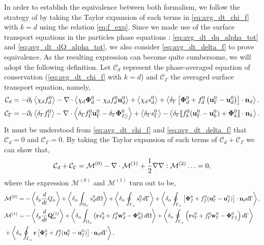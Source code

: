 In order to establish the equivalence between both formalism, we follow the strategy of \citep{lhuillier2000bilan,lhuillier2009rheology} by taking the Taylor expansion of each terms in \ref{eq:avg_dt_chi_f} with $k=d$ using the relation \ref{eq:f_exp}. 
Since we made use of the surface transport equations in the particles phase equations : \ref{eq:avg_dt_dq_alpha_tot} and \ref{eq:avg_dt_dQ_alpha_tot}, we also consider \ref{eq:avg_dt_delta_f} to prove equivalence. 
As the resulting expression can become quite cumbersome, we will adopt the following definition. 
Let $\mathcal{C}_d$ represent the phase-averaged equation of conservation (\ref{eq:avg_dt_chi_f} with $k=d$) and $\mathcal{C}_\Gamma $ the averaged surface transport equation, namely, 
\begin{align*}
    \mathcal{C}_d
    &=
    - \partial_t \left<\chi_df_d^0\right>
    - \mathbf{\nabla}\cdot \left<\chi_d \mathbf{\Phi}_d^0 - \chi_df_d^0 \textbf{u}_d^0\right>
    + \left<\chi_d s_d^0\right>
    + \left<\delta_\Gamma \left[
        \mathbf{\Phi}_d^0
        + f_d^0
        \left(
            \textbf{u}_\Gamma ^0
            - \textbf{u}_d^0
        \right)
    \right]
    \cdot \textbf{n}_d\right>.\\
    \mathcal{C}_\Gamma 
    &= 
    -\partial_t \left<\delta_\Gamma f_\Gamma ^0\right>
    -\mathbf{\nabla}\cdot \left<\delta_\Gamma  f_\Gamma ^0 \textbf{u}_\Gamma ^0-\delta_\Gamma  \mathbf{\Phi}_{I||}^0 \right>
    + \left<\delta_\Gamma s_\Gamma ^0\right> 
    - \left<\delta_\Gamma  \llbracket 
    f_k^0 (\textbf{u}_\Gamma ^0 - \textbf{u}_k^0)
    + \mathbf{\Phi}_k^0
     \rrbracket \cdot \textbf{n}_k \right>. 
\end{align*}
It must be understood from \ref{eq:avg_dt_chi_f} and \ref{eq:avg_dt_delta_f} that $\mathcal{C}_d=0$ and $\mathcal{C}_\Gamma =0$.
By taking the Taylor expansion of each terms of $\mathcal{C}_d+\mathcal{C}_\Gamma $ we can show that,
\begin{equation}
    \mathcal{C}_d 
    + \mathcal{C}_\Gamma  
    = \mathcal{M}^{(0)} - \mathbf{\nabla}\cdot \mathcal{M}^{(1)} + \frac{1}{2} \mathbf{\nabla}\mathbf{\nabla} : \mathcal{M}^{(2)} \ldots = 0,
    \label{eq:scheme_equivalence}
\end{equation} 
where the expression $\mathcal{M}^{(0)}$ and $\mathcal{M}^{(1)}$ turn out to be, 
\begin{align*}
    &\mathcal{M}^{(0)}
    = 
    - \left<\delta_p \frac{d}{dt} {Q_\alpha}\right>
    + \left<\delta_\alpha \int_{\Omega_{\alpha}}  s_d^0  d\Omega\right>
    + \left<\delta_\alpha \oint_{\Gamma_{\alpha}}  s_\Gamma ^0  d\Gamma\right>
    + \left<\delta_\alpha \oint_{\Gamma_{\alpha}}  
    \left[\mathbf{\Phi}_f^0 
    + f_f^0 (\textbf{u}_\Gamma ^0-\textbf{u}_f^0) \right] \cdot \textbf{n}_d  d\Gamma\right>,\\
    &\mathcal{M}^{(1)} =
    -  \left<\delta_p \frac{d}{dt} {\textbf{Q}_\alpha^{(1)}}\right>
     + \left<\delta_\alpha \int_{\Omega_{\alpha}}  \left(
        \textbf{r} s_d^0         
        + f_d^0  \textbf{w}_d^0 
        - \mathbf{\Phi}_d^0
    \right)  d\Omega\right>
    + \left<\delta_\alpha \oint_{\Gamma_{\alpha}}  \left(
        \textbf{r}s_\Gamma ^0
        + f_\Gamma ^0 \textbf{w}_\Gamma ^0
        - \mathbf{\Phi}_{\Gamma||}^0
    \right)  d\Gamma\right>\\
    &+ \left<\delta_\alpha \oint_{\Gamma_{\alpha}}  \textbf{r} \left[
        \mathbf{\Phi}_f^0
        + f_f^0 (\textbf{u}_\Gamma ^0-\textbf{u}_f^0)
    \right]\cdot \textbf{n}_d   d\Gamma\right>,
\end{align*}
